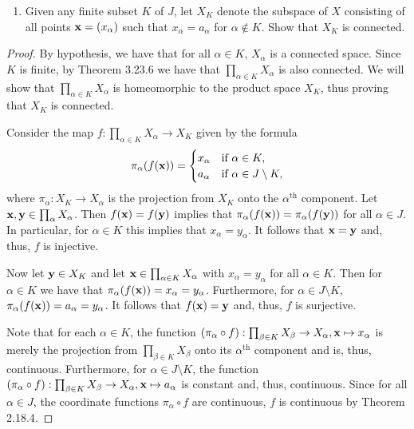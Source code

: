 \begin{solution}
  \begin{enumerate}[label={(\alph*)}, align=left, leftmargin=\parindent, listparindent=\parindent, labelwidth=0pt, itemindent=!]
    \item
      Given any finite subset $K$ of $J$, let $X_K$ denote the subspace of $X$ consisting of all points $\mathbf{x} = (x_\alpha)$ such that $x_\alpha = a_\alpha$ for $\alpha \not\in K$.
      Show that $X_K$ is connected.
  \end{enumerate}
  \begin{proof}
    By hypothesis, we have that for all $\alpha \in K$, $X_\alpha$ is a connected space.
    Since $K$ is finite, by Theorem 3.23.6 we have that $\prod_{\alpha\in K} X_\alpha$ is also connected.
    We will show that $\prod_{\alpha\in K} X_\alpha$ is homeomorphic to the product space $X_K$, thus proving that $X_K$ is connected.

    Consider the map $f: \prod_{\alpha\in K} X_\alpha \rightarrow X_K$ given by the formula
    \begin{equation*}
      \pi_\alpha(f(\mathbf{x})) =
      \begin{cases}
        x_\alpha  &\text{if } \alpha \in K, \\
        a_\alpha  &\text{if } \alpha \in J \setminus K,
      \end{cases}
    \end{equation*}
    where $\pi_\alpha: X_K \rightarrow X_\alpha$ is the projection from $X_K$ onto the $\alpha^{\text{th}}$ component.
    Let $\mathbf{x}, \mathbf{y} \in \prod_\alpha X_\alpha$.
    Then $f(\mathbf{x}) = f(\mathbf{y})$ implies that $\pi_\alpha(f(\mathbf{x})) = \pi_\alpha(f(\mathbf{y}))$ for all $\alpha \in J$.
    In particular, for $\alpha \in K$ this implies that $x_\alpha = y_\alpha$.
    It follows that $\mathbf{x} = \mathbf{y}$ and, thus, $f$ is injective.

    Now let $\mathbf{y} \in X_K$ and let $\mathbf{x} \in \prod_{\alpha\in K} X_\alpha$ with $x_\alpha = y_\alpha$ for all $\alpha \in K$.
    Then for $\alpha \in K$ we have that $\pi_\alpha(f(\mathbf{x})) = x_\alpha = y_\alpha$.
    Furthermore, for $\alpha \in J \setminus K$, $\pi_\alpha(f(\mathbf{x})) = a_\alpha = y_\alpha$.
    It follows that $f(\mathbf{x}) = \mathbf{y}$ and, thus, $f$ is surjective.

    Note that for each $\alpha \in K$, the function $(\pi_\alpha \circ f): \prod_{\beta\in K} X_\beta \rightarrow X_\alpha, \mathbf{x} \mapsto x_\alpha$ is merely the projection from $\prod_{\beta\in K} X_\beta$ onto its $\alpha^{\text{th}}$ component and is, thus, continuous.
    Furthermore, for $\alpha \in J \setminus K$, the function $(\pi_\alpha \circ f): \prod_{\beta\in K} X_\beta \rightarrow X_\alpha, \mathbf{x} \mapsto a_\alpha$ is constant and, thus, continuous.
    Since for all $\alpha \in J$, the coordinate functions $\pi_\alpha \circ f$ are continuous, $f$ is continuous by Theorem 2.18.4.


\end{proof}
\end{solution}
